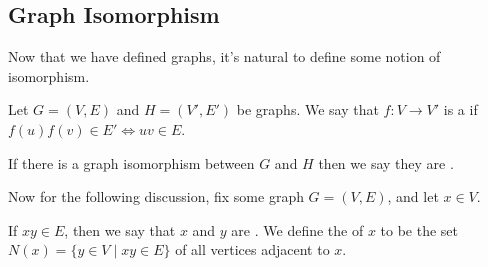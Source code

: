 \documentclass[a4paper]{scrreprt}
\begin{document}
\subsection{Graph Isomorphism}

Now that we have defined graphs, it's natural to define some notion of isomorphism.

\begin{definition}
	Let $G = (V, E)$ and $H = (V', E')$ be graphs. We say that $f : V \rightarrow V'$ is a  if $f(u)f(v) \in E' \iff uv \in E$. 

	If there is a graph isomorphism between $G$ and $H$ then we say they are .
\end{definition}

Now for the following discussion, fix some graph $G = (V, E)$, and let $x \in V$. 

\begin{definition}[Neighbourhood]
	If $xy \in E$, then we say that $x$ and $y$ are .
	We define the  of $x$ to be the set $N(x) = \{ y \in V \mid xy \in E\}$ of all vertices adjacent to $x$.
\end{definition}
\end{document}
